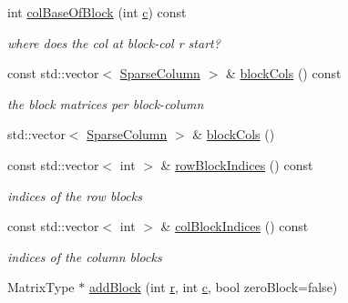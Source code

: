 \begin{DoxyCompactItemize}
int \hyperlink{classg2o_1_1SparseBlockMatrixHashMap_a533a55bea873a2851741f8f5be3cfd83}{col\+Base\+Of\+Block} (int \hyperlink{sparse__helper_8cpp_a4e1e0e72dd773439e333c84dd762a9c3}{c}) const 
\begin{DoxyCompactList}\small\item\em where does the col at block-\/col r start? \end{DoxyCompactList}\item 
const std\+::vector$<$ \hyperlink{classg2o_1_1SparseBlockMatrixHashMap_ae364a722296b90e32dd6c3a8fbeb49ae}{Sparse\+Column} $>$ \& \hyperlink{classg2o_1_1SparseBlockMatrixHashMap_a9d81b373b456ec74e214d1e378664933}{block\+Cols} () const 
\begin{DoxyCompactList}\small\item\em the block matrices per block-\/column \end{DoxyCompactList}\item 
std\+::vector$<$ \hyperlink{classg2o_1_1SparseBlockMatrixHashMap_ae364a722296b90e32dd6c3a8fbeb49ae}{Sparse\+Column} $>$ \& \hyperlink{classg2o_1_1SparseBlockMatrixHashMap_a2879ea0d9b530e7c522c912dff279b5d}{block\+Cols} ()
\item 
const std\+::vector$<$ int $>$ \& \hyperlink{classg2o_1_1SparseBlockMatrixHashMap_ab68b1dacc1fe4abc86eef0df9caf283c}{row\+Block\+Indices} () const 
\begin{DoxyCompactList}\small\item\em indices of the row blocks \end{DoxyCompactList}\item 
const std\+::vector$<$ int $>$ \& \hyperlink{classg2o_1_1SparseBlockMatrixHashMap_acc0352ad576ea5c5cebc76ba636ec481}{col\+Block\+Indices} () const 
\begin{DoxyCompactList}\small\item\em indices of the column blocks \end{DoxyCompactList}\item 
Matrix\+Type $\ast$ \hyperlink{classg2o_1_1SparseBlockMatrixHashMap_a08330c47b1b60bbe008e3c4ee2f5150f}{add\+Block} (int \hyperlink{sparse__helper_8cpp_acab531abaa74a7e664e3986f2522b33a}{r}, int \hyperlink{sparse__helper_8cpp_a4e1e0e72dd773439e333c84dd762a9c3}{c}, bool zero\+Block=false)
\end{DoxyCompactItemize}
